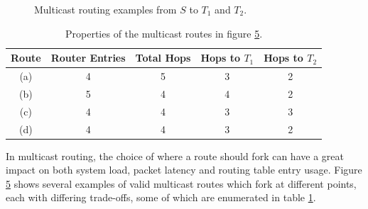 				\begin{figure}
					\begin{subfigure}[b]{0.24\textwidth}
						\center
						
						\caption{}
						\label{fig:multicast-routing-a}
					\end{subfigure}
					\begin{subfigure}[b]{0.24\textwidth}
						\center
						
						\caption{}
						\label{fig:multicast-routing-b}
					\end{subfigure}
					\begin{subfigure}[b]{0.24\textwidth}
						\center
						
						\caption{}
						\label{fig:multicast-routing-c}
					\end{subfigure}
					\begin{subfigure}[b]{0.24\textwidth}
						\center
						
						\caption{}
						\label{fig:multicast-routing-d}
					\end{subfigure}
					\caption[Multicast routing examples.]{Multicast routing examples from
					$S$ to $T_1$ and $T_2$.}
					\label{fig:multicast-routing}
				\end{figure}
				
				\begin{table}
					\center
					\begin{tabular}{c c c c c}
						\toprule
							Route & Router Entries & Total Hops & Hops to $T_1$ & Hops to $T_2$ \\
						\midrule
							(a)   & 4              & 5          & 3             & 2             \\
							(b)   & 5              & 4          & 4             & 2             \\
							(c)   & 4              & 4          & 3             & 3             \\
							(d)   & 4              & 4          & 3             & 2             \\
						\bottomrule
					\end{tabular}
					
					\caption{Properties of the multicast routes in figure
					\ref{fig:multicast-routing}.}
					\label{tab:multicast-route-metrics}
				\end{table}
				
				In multicast routing, the choice of where a route should fork can have a
				great impact on both system load, packet latency and routing table entry
				usage. Figure \ref{fig:multicast-routing} shows several examples of
				valid multicast routes which fork at different points, each with
				differing trade-offs, some of which are enumerated in table
				\ref{tab:multicast-route-metrics}.
				
